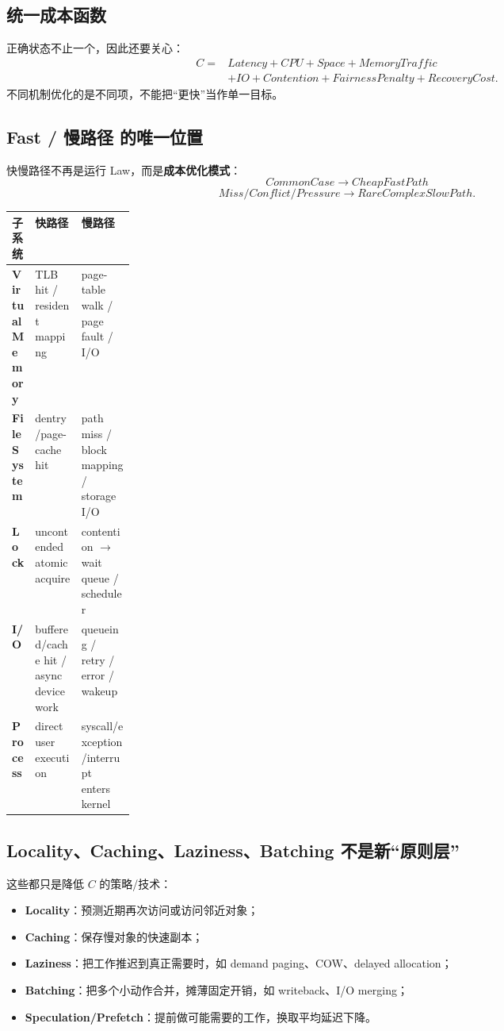 \documentclass[11pt,a4paper]{ctexart}
\newcommand{\kw}[1]{\textbf{#1}}
\begin{document}
\subsection{统一成本函数}
正确状态不止一个，因此还要关心：
\[
\boxed{\begin{aligned}
C={}&Latency+CPU+Space+MemoryTraffic\\
   &+IO+Contention+FairnessPenalty+RecoveryCost.
\end{aligned}}
\]
不同机制优化的是不同项，不能把“更快”当作单一目标。

\subsection{Fast / 慢路径 的唯一位置}
快慢路径不再是运行 Law，而是\kw{成本优化模式}：
\[
\boxed{CommonCase\rightarrow CheapFastPath}
\]
\[
\boxed{Miss/Conflict/Pressure\rightarrow RareComplexSlowPath}.
\]

\begin{center}
\small
\begin{tabularx}{\linewidth}{>{\bfseries}p{0.18\linewidth} X X}
\toprule
子系统 & 快路径 & 慢路径 \\
\midrule
Virtual Memory & TLB hit / resident mapping & page-table walk / page fault / I/O \\
File System & dentry/page-cache hit & path miss / block mapping / storage I/O \\
Lock & uncontended atomic acquire & contention $\to$ wait queue / scheduler \\
I/O & buffered/cache hit / async device work & queueing / retry / error / wakeup \\
Process & direct user execution & syscall/exception/interrupt enters kernel \\
\bottomrule
\end{tabularx}
\end{center}

\subsection{Locality、Caching、Laziness、Batching 不是新“原则层”}
这些都只是降低 $C$ 的策略/技术：
\begin{itemize}
  \item \kw{Locality}：预测近期再次访问或访问邻近对象；
  \item \kw{Caching}：保存慢对象的快速副本；
  \item \kw{Laziness}：把工作推迟到真正需要时，如 demand paging、COW、delayed allocation；
  \item \kw{Batching}：把多个小动作合并，摊薄固定开销，如 writeback、I/O merging；
  \item \kw{Speculation/Prefetch}：提前做可能需要的工作，换取平均延迟下降。
\end{itemize}
\end{document}
